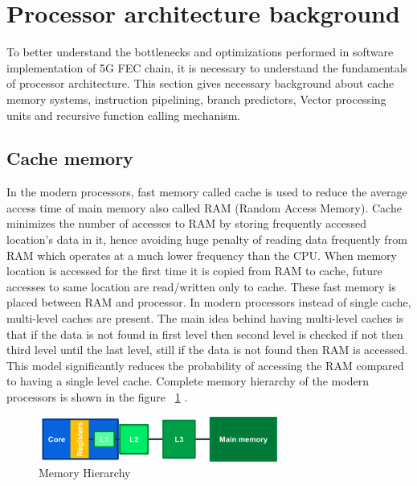 

\section{Processor architecture background}
To better understand the bottlenecks and optimizations performed in software implementation of 5G FEC chain, it is necessary to understand the fundamentals of processor architecture. This section gives necessary background about cache memory systems, instruction pipelining, branch predictors, Vector processing units and recursive function calling mechanism.

\subsection{Cache memory} \label{cacheSection}
In the modern processors, fast memory called cache is used to reduce the average access time of main memory also called RAM (Random Access Memory). Cache minimizes the number of accesses to RAM by storing frequently accessed location's data in it, hence avoiding huge penalty of reading data frequently from RAM which operates at a much lower frequency than the CPU. When memory location is accessed for the first time it is copied from RAM to cache, future accesses to same location are read/written only to cache. These fast memory is placed between RAM and processor. In modern processors instead of single cache, multi-level caches are present. The main idea behind having multi-level caches is that if the data is not found in first level then second level is checked if not then third level until the last level, still if the data is not found then RAM is accessed. This model significantly reduces the probability of accessing the RAM compared to having a single level cache. Complete memory hierarchy of the modern processors is shown in the figure  ~\ref{fig:memoryHierarchy} \cite{CMP}.

\begin{figure}[h]
	\centering
	\includegraphics[width=0.7\textwidth]{./figures/memoryHierarchy.pdf}
	\caption{Memory Hierarchy}
	\label{fig:memoryHierarchy}
\end{figure}


